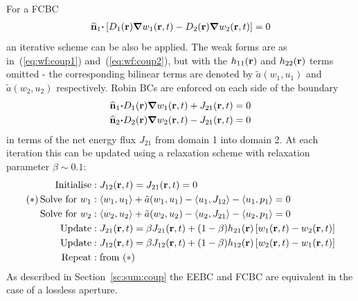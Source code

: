 \documentclass[a4paper]{article}
\numberwithin{equation}{section}
\begin{document}
For a FCBC
\begin{align}
\widehat{\boldsymbol{\mathrm{n}}}_1{\boldsymbol{\mathrm{\cdot}}}\left[D_1(\boldsymbol{\mathrm{r}}){\boldsymbol{\mathrm{\nabla}}}w_1(\boldsymbol{\mathrm{r}},t)-D_2(\boldsymbol{\mathrm{r}}){\boldsymbol{\mathrm{\nabla}}}w_2(\boldsymbol{\mathrm{r}},t)\right]=0
\end{align}
an iterative scheme can be also be applied. The weak forms are as in~(\ref{eq:wf:coup1}) 
and~(\ref{eq:wf:coup2}), but with the $h_{11}(\boldsymbol{\mathrm{r}})$ and $h_{22}(\boldsymbol{\mathrm{r}})$ terms omitted - the 
corresponding bilinear terms are denoted by $\tilde{a}(w_1,u_1)$ and $\tilde{a}(w_2,u_2)$ 
respectively. Robin BCs are enforced on each side of the boundary 
\begin{align}
\widehat{\boldsymbol{\mathrm{n}}}_1{\boldsymbol{\mathrm{\cdot}}}D_1(\boldsymbol{\mathrm{r}}){\boldsymbol{\mathrm{\nabla}}}w_1(\boldsymbol{\mathrm{r}},t)+J_{21}(\boldsymbol{\mathrm{r}},t) &=0 \\
\widehat{\boldsymbol{\mathrm{n}}}_2{\boldsymbol{\mathrm{\cdot}}}D_2(\boldsymbol{\mathrm{r}}){\boldsymbol{\mathrm{\nabla}}}w_2(\boldsymbol{\mathrm{r}},t)-J_{21}(\boldsymbol{\mathrm{r}},t) &=0
\end{align}
in terms of the net energy flux $J_{21}$ from domain 1 into domain 2. At each iteration this can be
updated using a relaxation scheme with relaxation parameter $\beta\sim 0.1$:
\begin{align}
\mathrm{Initialise} &: J_{12}(\boldsymbol{\mathrm{r}},t) = J_{21}(\boldsymbol{\mathrm{r}},t) = 0 \nonumber \\
\mathrm{(\ast)\,Solve\,\,for}\,\,w_1 &: \langle w_1,u_1 \rangle + \tilde{a}(w_1,u_1) - \langle u_1 , J_{12} \rangle - \langle u_1 , p_1 \rangle = 0 \nonumber \\
\mathrm{Solve\,\,for}\,\,w_2 &: \langle w_2,u_2 \rangle + \tilde{a}(w_2,u_2) - \langle u_2 , J_{21} \rangle - \langle u_2 , p_1 \rangle = 0 \nonumber \\
\mathrm{Update} &: J_{21}(\boldsymbol{\mathrm{r}},t) = \beta J_{21}(\boldsymbol{\mathrm{r}},t) + ( 1 - \beta) h_{21}(\boldsymbol{\mathrm{r}}) \left[ w_1(\boldsymbol{\mathrm{r}},t) - w_2(\boldsymbol{\mathrm{r}},t) \right] \nonumber \\
\mathrm{Update} &: J_{12}(\boldsymbol{\mathrm{r}},t) = \beta J_{12}(\boldsymbol{\mathrm{r}},t) + ( 1 - \beta) h_{12}(\boldsymbol{\mathrm{r}}) \left[ w_2(\boldsymbol{\mathrm{r}},t) - w_1(\boldsymbol{\mathrm{r}},t) \right] \nonumber \\
\mathrm{Repeat} &: \mathrm{from}\,\,(\ast) \nonumber
\end{align}
As described in Section~\ref{sc:sum:coup} the EEBC and FCBC are equivalent in the case of a lossless aperture. 
\end{document}
